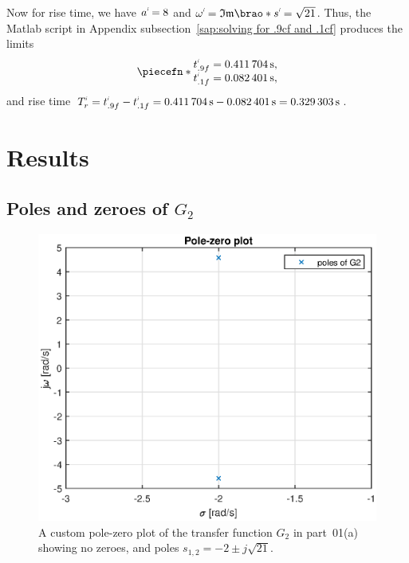 \documentclass[12pt]{article}
\DeclarePairedDelimiter\brao()%
\DeclarePairedDelimiter\piecefn\{.
\newcommand{\setprime}[2][1]{%
    {#2}^{%
        \raisebox{1pt}{%
            \scalebox{0.5}{%
                \itshape\sffamily\uppercase%
                \expandafter{%
                    \romannumeral#1%
                }%
            }%
        }
    }%
}%
\begin{document}
\begin{enumerate}[(a)]
        Now for rise time, we have $\setprime{a} = 8$ and $\setprime\omega = \mathfrak{Im}\brao*{\setprime{s}} = \sqrt{21}$.
        Thus, the Matlab script in Appendix subsection~\ref{sap:solving for .9cf and .1cf} produces the limits
        \begin{equation}
            \piecefn*{
                \begin{array}{@{}l@{}}
                    \setprime{t}_{.9f} = \SI{0.411704}\second,
                \\*
                    \setprime{t}_{.1f} = \SI{0.082401}\second,
                \\*
                \end{array}
            }
        \end{equation}
        and rise time $\setprime{T}_r = \setprime{t}_{.9f} - \setprime{t}_{.1f} = \SI{0.411704}\second - \SI{0.082401}\second = \SI{0.329303}\second$.

\end{enumerate}



\section{Results}

\subsection{Poles and zeroes of $G_2$}

\begin{figure}
    \centering
    \includegraphics[width=\linewidth]{img/part01a_pzplot.eps}
    \caption{A custom pole-zero plot of the transfer function $G_2$ in part~01(a) showing no zeroes, and poles $s_{1,2} = -2 \pm j\sqrt{21}$.}
    \label{fig:pzplot_1a}
\end{figure}
\end{document}
